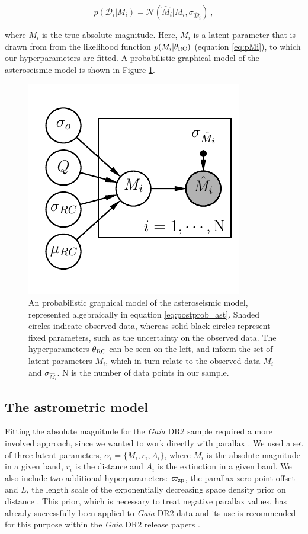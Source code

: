 \documentclass[fleqn,usenatbib]{mnras}
\newcommand{\oozp}{\mbox{$\varpi_{\rm zp}$}\xspace}
\newcommand{\gaia}{\emph{Gaia}\xspace}
\newcommand{\new}[1]{#1}
\begin{document}
\begin{equation}
p(\mathcal{D}_i | M_i) = \mathcal{N}(\hat{M}_i | M_i, \sigma_{\hat{M}_i})\ ,
\end{equation}

\noindent where $M_i$ is the true absolute magnitude. Here, $M_i$ is a latent parameter that is drawn from from the likelihood function $p(M_i | \theta_{\rm RC})$ (equation \ref{eq:pMi}), to which our hyperparameters are fitted. A probabilistic graphical model of the asteroseismic model is shown in Figure \ref{fig:asteromodel}.

\begin{figure}
\centering
\includegraphics[width=.48\textwidth]{asterostan.pdf}
\caption{An probabilistic graphical model of the asteroseismic model, represented algebraically in equation \ref{eq:postprob_ast}. Shaded circles indicate observed data, \new{whereas solid black circles represent fixed parameters}, such as the uncertainty on the observed data. The hyperparameters $\theta_{\rm RC}$ can be seen on the left, and inform the set of latent parameters $M_i$, which in turn relate to the observed data $\hat{M_i}$ and $\sigma_{\hat{M}_i}$. N is the number of data points in our sample.}
\label{fig:asteromodel}
\end{figure}

\subsection{The astrometric model}
Fitting the absolute magnitude for the \gaia DR2 sample required a more involved approach, since we wanted to work directly with parallax \citep{art:luri+2018}. We used a set of three latent parameters, $\alpha_i = \{M_i, r_i, A_i\}$, where $M_i$ is the absolute magnitude in a given band, $r_i$ is the distance and $A_i$ is the extinction in a given band. We also include two additional hyperparameters: \oozp, the parallax zero-point offset and $L$, the length scale of the exponentially decreasing space density prior on distance \citep{art:astraatmadja+bailer-jones2016,art:astraatmadja+bailer-jones2016a, art:astraatmadja+bailer-jones2017}. This prior, which is necessary to treat negative parallax values, has already successfully been applied to \gaia DR2 data \citep{art:bailer-jones+2018} and its use is recommended for this purpose within the \gaia DR2 release papers \citep{art:luri+2018}.
\end{document}
